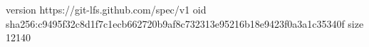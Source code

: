 version https://git-lfs.github.com/spec/v1
oid sha256:c9495f32c8d1f7c1ecb662720b9af8c732313e95216b18e9423f0a3a1c35340f
size 12140
